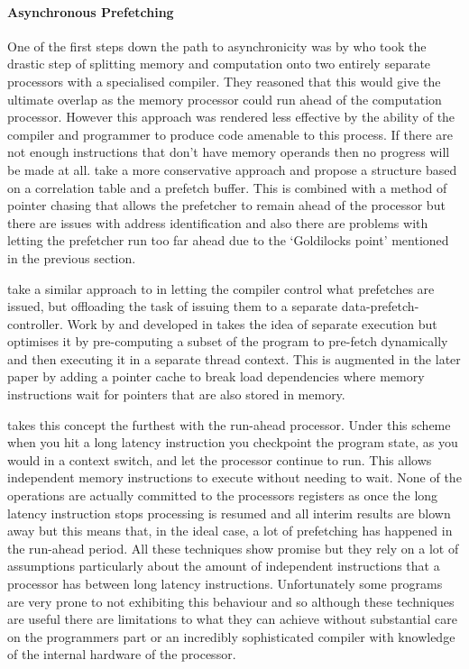 \paragraph{Asynchronous Prefetching}

One of the first steps down the path to asynchronicity was by \citet{veidenbaumDecoupledAccessDRAM1997} who took the drastic step of splitting memory and computation onto two entirely separate processors with a specialised compiler. They reasoned that this would give the ultimate overlap as the memory processor could run ahead of the computation processor. However this approach was rendered less effective by the ability of the compiler and programmer to produce code amenable to this process. If there are not enough instructions that don't have memory operands then no progress will be made at all. \citet{rothDependenceBasedPrefetching1998} take a more conservative approach and propose a structure based on a correlation table and a prefetch buffer. This is combined with a method of pointer chasing that allows the prefetcher to remain ahead of the processor but there are issues with address identification and also there are problems with letting the prefetcher run too far ahead due to the `Goldilocks point' mentioned in the previous section.

\citet{vanderwielCompilerassistedDataPrefetch1999} take a similar approach to \citeauthor{veidenbaumDecoupledAccessDRAM1997} in letting the compiler control what prefetches are issued, but offloading the task of issuing them to a separate data-prefetch-controller. Work by \citet{collinsDynamicSpeculativePrecomputation2001} and developed in \citeyear{collinsPointerCacheAssisted2002} \cite{collinsPointerCacheAssisted2002} takes the idea of separate execution but optimises it by pre-computing a subset of the program to pre-fetch dynamically and then executing it in a separate thread context. This is augmented in the later paper by adding a pointer cache to break load dependencies where memory instructions wait for pointers that are also stored in memory. 

\citet{mutluRunaheadExecutionAlternative2003, mutluRunaheadExecutionEffective2003} takes this concept the furthest with the run-ahead processor. Under this scheme when you hit a long latency instruction you checkpoint the program state, as you would in a context switch, and let the processor continue to run. This allows independent memory instructions to execute without needing to wait. None of the operations are actually committed to the processors registers as once the long latency instruction stops processing is resumed and all interim results are blown away but this means that, in the ideal case, a lot of prefetching has happened in the run-ahead period. All these techniques show promise but they rely on a lot of assumptions particularly about the amount of independent instructions that a processor has between long latency instructions. Unfortunately some programs are very prone to not exhibiting this behaviour and so although these techniques are useful there are limitations to what they can achieve without substantial care on the programmers part or an incredibly sophisticated compiler with knowledge of the internal hardware of the processor.

